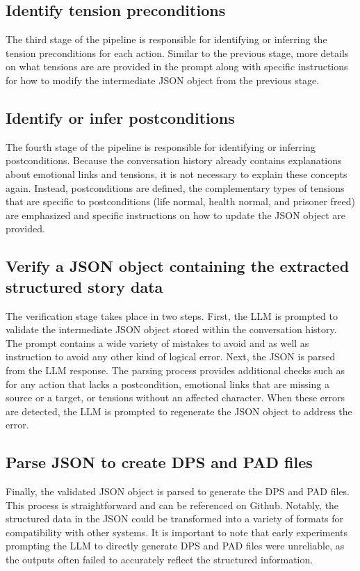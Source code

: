 \documentclass[phd,electronic,oneside,twosidetoc,letterpaper,chaptercenter,parttop,lof]{byumsphd}
\begin{document}
\subsection{Identify tension preconditions}

The third stage of the pipeline is responsible for identifying or inferring the tension preconditions for each action. Similar to the previous stage, more details on what tensions are are provided in the prompt along with specific instructions for how to modify the intermediate JSON object from the previous stage. 

\subsection{Identify or infer postconditions}

The fourth stage of the pipeline is responsible for identifying or inferring postconditions. Because the conversation history already contains explanations about emotional links and tensions, it is not necessary to explain these concepts again. Instead, postconditions are defined, the complementary types of tensions that are specific to postconditions (life normal, health normal, and prisoner freed) are emphasized and specific instructions on how to update the JSON object are provided.


\subsection{Verify a JSON object containing the extracted structured story data}

The verification stage takes place in two steps. First, the LLM is prompted to validate the intermediate JSON object stored within the conversation history. The prompt contains a wide variety of mistakes to avoid and as well as instruction to avoid any other kind of logical error. Next, the JSON is parsed from the LLM response. The parsing process provides additional checks such as for any action that lacks a postcondition, emotional links that are missing a source or a target, or tensions without an affected character. When these errors are detected, the LLM is prompted to regenerate the JSON object to address the error. 


\subsection{Parse JSON to create DPS and PAD files}

Finally, the validated JSON object is parsed to generate the DPS and PAD files. This process is straightforward and can be referenced on Github.  Notably, the structured data in the JSON could be transformed into a variety of formats for compatibility with other systems. It is important to note that early experiments prompting the LLM to directly generate DPS and PAD files were unreliable, as the outputs often failed to accurately reflect the structured information.
\end{document}
